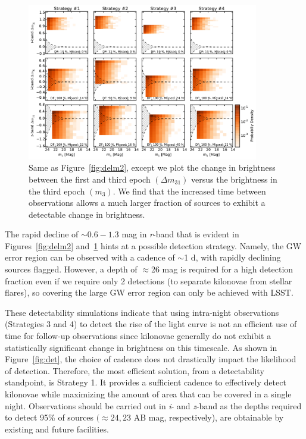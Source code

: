 \begin{figure}[t!]
\centering
\includegraphics[width=0.9\textwidth]{./figs/chapter2/ch2_f7.pdf}
\caption{Same as Figure~\ref{fig:delm2}, except we plot the change in brightness between the first and third epoch $(\Delta m_{31})$ versus the brightness in the third epoch $(m_3)$. We find that the increased time between observations allows a much larger fraction of sources to exhibit a detectable change in brightness.}
\label{fig:delm3}
\end{figure}
   
The rapid decline of $\sim0.6-1.3$ mag in {\em r}-band that is evident in Figures~\ref{fig:delm2} and~\ref{fig:delm3} hints at a possible detection strategy. Namely, the GW error region can be observed with a cadence of $\sim$1 d, with rapidly declining sources flagged. However, a depth of $\approx$26 mag is required for a high detection fraction even if we require only 2 detections (to separate kilonovae from stellar flares), so covering the large GW error region can only be achieved with LSST.
   
These detectability simulations indicate that using intra-night observations (Strategies 3 and 4) to detect the rise of the light curve is not an efficient use of time for follow-up observations since kilonovae generally do not exhibit a statistically significant change in brightness on this timescale. As shown in Figure~\ref{fig:det}, the choice of cadence does not drastically impact the likelihood of detection. Therefore, the most efficient solution, from a detectability standpoint, is Strategy 1. It provides a sufficient cadence to effectively detect kilonovae while maximizing the amount of area that can be covered in a single night. Observations should be carried out in {\em i}- and {\em z}-band as the depths required to detect 95\% of sources $(\approx 24,23$ AB mag, respectively), are obtainable by existing and future facilities.

